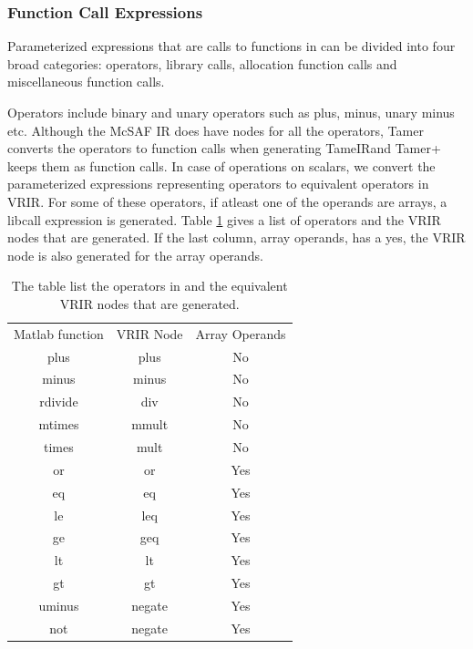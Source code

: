 \subsubsection{Function Call Expressions}
Parameterized expressions that are calls to functions in \matlab can be divided into four broad categories: operators, library calls, allocation function calls and miscellaneous function calls. 

Operators include binary and unary operators such as plus, minus, unary minus etc. Although the McSAF IR does have nodes for all the operators, Tamer converts the operators to function calls when generating TameIRand Tamer+ keeps them as function calls. In case of operations on scalars, we convert the parameterized expressions representing operators to equivalent operators in VRIR. For some of these operators, if atleast one of the operands are arrays, a libcall expression is generated. Table \ref{tab:opGen} gives a list of \matlab operators  and the VRIR nodes that are generated. If the last column, array operands, has a yes, the VRIR node is also generated for the array operands. 
\begin{table}[htbp]
\centering
\begin{tabular}{|c|c|c|}
\hline
Matlab function & VRIR Node & Array Operands \\ \hhline{|=|=|=|}
plus            & plus   & No   \\ \hline
minus           & minus  & No   \\ \hline
rdivide         & div    & No   \\ \hline
mtimes          & mmult  & No   \\ \hline
times           & mult   & No   \\ \hline
or              & or     & Yes   \\ \hline
eq              & eq     & Yes   \\ \hline
le              & leq    & Yes   \\ \hline
ge              & geq    & Yes   \\ \hline
lt              & lt     & Yes   \\ \hline
gt              & gt     & Yes   \\ \hline
uminus          & negate & Yes   \\ \hline
not             & negate & Yes   \\ \hline
\end{tabular}
\caption[List of operators in \matlab and their equivalent VRIR nodes]{ The table list the operators in \matlab and the equivalent VRIR nodes that are generated. }
\label{tab:opGen}
\end{table}

